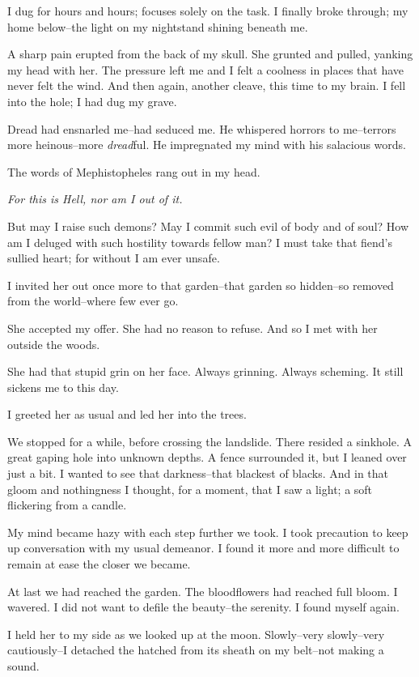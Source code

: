 \documentclass{article}
\begin{document}
I dug for hours and hours; focuses solely on the task.
I finally broke through; my home below--the
light on my nightstand shining beneath me.


A sharp pain erupted from the back of my skull.
She grunted and pulled, yanking my head with her.
The pressure left me and I felt a coolness in
places that have never felt the wind.
And then again, another cleave, this time to my brain.
I fell into the hole; I had dug my grave.
\vvvv


\noindent
Dread had ensnarled me--had seduced me.
He whispered horrors to me--terrors
more heinous--more \textit{dread}ful.
He impregnated my mind with his salacious words.
\VV

\noindent
The words of Mephistopheles rang out in my head.
\VV


\textit{For this is Hell, nor am I out of it.}
\VV


\noindent
But may I raise such demons?
May I commit such evil of body and of soul?
How am I deluged with such hostility towards fellow man?
I must take that fiend's sullied heart;
for without I am ever unsafe.
\VV


\noindent
I invited her out once more to that garden--that
garden so hidden--so removed from the world--where
few ever go. %


She accepted my offer.
She had no reason to refuse.
And so I met with her outside the woods.


She had that stupid grin on her face.
Always grinning. Always scheming.
It still sickens me to this day.


I greeted her as usual and led her into the trees.


We stopped for a while, before crossing the landslide.
There resided a sinkhole.
A great gaping hole into unknown depths.
A fence surrounded it,
but I leaned over just a bit.
I wanted to see that darkness--that
blackest of blacks.
And in that gloom and nothingness I thought, for a moment,
that I saw a light; a soft flickering from a candle.


My mind became hazy with each step further we took.
I took precaution to keep up conversation with
my usual demeanor.
I found it more and more difficult to remain at ease the closer we became.


At last we had reached the garden.
The bloodflowers had reached full bloom.
I wavered.  I did not want to defile the beauty--the serenity.
I found myself again.


I held her to my side as we looked up at the moon.
Slowly--very slowly--very cautiously--I
detached the hatched from its sheath on my belt--not making a sound.
\end{document}
